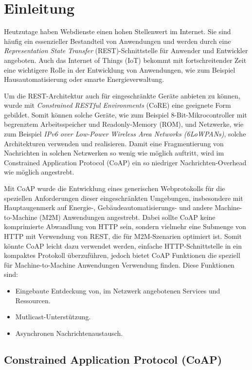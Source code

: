 \section{Einleitung}
\label{sec:einleitung}

Heutzutage haben Webdienste einen hohen Stellenwert im Internet. Sie sind häufig ein essenzieller Bestandteil von Anwendungen und werden durch eine \textit{Representation State Transfer} (REST)-Schnittstelle für Anwender und Entwickler angeboten. Auch das Internet of Things (IoT) bekommt mit fortschreitender Zeit eine wichtigere Rolle in der Entwicklung von Anwendungen, wie zum Beispiel Hausautomatisierung oder smarte Energieverwaltung.

Um die REST-Architektur auch für eingeschränkte Geräte anbieten zu können, wurde mit \textit{Constrained RESTful Environments} (CoRE) eine geeignete Form gebildet. Somit können solche Geräte, wie zum Beispiel 8-Bit-Mikrocontroller mit begrenztem Arbeitsspeicher und Readonly-Memory (ROM), und Netzwerke, wie zum Beispiel \textit{IPv6 over Low-Power Wireless Area Networks (6LoWPANs)}, solche Architekturen verwenden und realisieren. Damit eine Fragmentierung von Nachrichten in solchen Netzwerken so wenig wie möglich auftritt, wird im Constrained Application Protocol (CoAP) ein so niedriger Nachrichten-Overhead wie möglich angestrebt.

Mit CoAP wurde die Entwicklung eines generischen Webprotokolls für die speziellen Anforderungen dieser eingeschränkten Umgebungen, insbesondere mit Hauptaugenmerk auf Energie-, Gebäudeautomatisierungs- und andere Machine-to-Machine (M2M) Anwendungen angestrebt. Dabei sollte CoAP keine komprimierte Abwandlung von HTTP sein, sondern vielmehr eine Submenge von HTTP mit Verwendung von REST, die für M2M-Szenarien optimiert ist. Somit könnte CoAP leicht dazu verwendet werden, einfache HTTP-Schnittstelle in ein kompaktes Protokoll überzuführen, jedoch bietet CoAP Funktionen die speziell für Machine-to-Machine Anwendungen Verwendung finden. Diese Funktionen sind:
\begin{itemize}
    \item Eingebaute Entdeckung von, im Netzwerk angebotenen Services und Ressourcen.
    \item Mutlicast-Unterstützung.
    \item Asynchronen Nachrichtenaustausch.
\end{itemize}

\subsection{Constrained Application Protocol (CoAP)}
\label{subsec:constrained-application-protocol}

